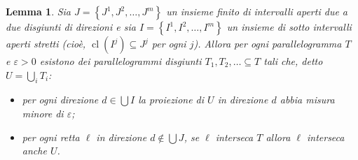 \documentclass[a4paper, twoside]{article}
\newcommand{\<}{\langle}
\renewcommand{\>}{\rangle}
\newtheorem{lemma}[teo]{Lemma}
\begin{document}
\begin{lemma} \label{altroarticolo}
	Sia $J=\left\{J^{1}, J^{2}, \ldots, J^{m}\right\}$ un insieme finito di intervalli aperti due a due disgiunti di direzioni e sia $I=\left\{I^{1}, I^{2}, \ldots, I^{m}\right\}$ un insieme di sotto intervalli aperti stretti (cioè, $\operatorname{cl}\left(I^{j}\right) \subseteq J^{j}$ per ogni $j$). Allora per ogni parallelogramma $T$ e $\varepsilon>0$ esistono dei parallelogrammi disgiunti $T_{1}, T_{2}, \ldots \subseteq T$ tali che, detto $U=\bigcup_iT_i$:
	
	\begin{itemize}
		\item per ogni direzione $d \in \bigcup I$ la proiezione di $U$ in direzione $d$ abbia misura minore di $\varepsilon$;
		\item per ogni retta $\ell$ in direzione $d \notin \bigcup J$, se $\ell$ interseca $T$ allora $\ell$ interseca anche $U$.	
	\end{itemize}
\end{lemma}	
\end{document}
